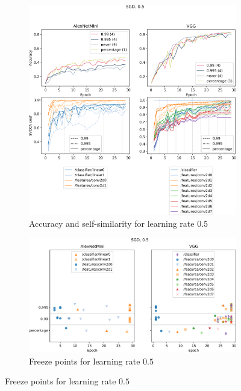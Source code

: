 \begin{figure}
    \centering
    \caption{Layer convergence experiment with learning rate $0.5$}
    \label{fig:saturation_alexnet_vgg_sgd_05}
    \begin{subfigure}{\textwidth}
        \includegraphics[width=\linewidth]{gfx/diagrams/experiments/saturation/acc_sim_alexnetmini_vgg_sgd_05.pdf}
        \caption{Accuracy and self-similarity for learning rate $0.5$}
        \label{fig:saturation_alexnet_vgg_sgd_05_similarity}
    \end{subfigure}

    \begin{subfigure}{\textwidth}
        \includegraphics[width=\linewidth]{gfx/diagrams/experiments/saturation/convergence_alexnetmini_vgg_sgd_05.pdf}
        \caption{Freeze points for learning rate $0.5$}
        \label{fig:saturation_alexnet_vgg_sgd_05_convergence}
    \end{subfigure}
\end{figure}

